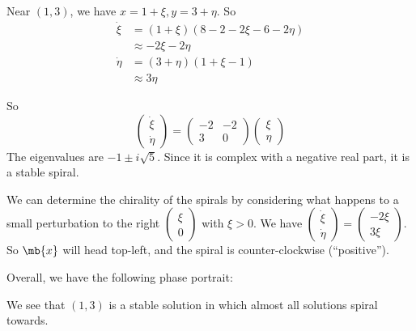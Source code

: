 \documentclass[a4paper]{article}
\begin{document}
\begin{eg}
Near $(1, 3)$, we have $x = 1 + \xi, y = 3 + \eta$. So
\begin{align*}
  \dot \xi &= (1 + \xi)(8 - 2 - 2\xi - 6 - 2\eta)\\
  &\approx -2\xi - 2\eta\\
  \dot\eta &= (3 + \eta)(1 + \xi - 1)\\
  &\approx 3\eta
\end{align*}

So
\[
\begin{pmatrix}
  \dot\xi\\\dot\eta
\end{pmatrix} = 
\begin{pmatrix}
  -2 & -2\\
  3 & 0
\end{pmatrix}
\begin{pmatrix}
  \xi\\\eta
\end{pmatrix}
\]
The eigenvalues are $- 1\pm i\sqrt{5}$. Since it is complex with a negative real part, it is a stable spiral.

We can determine the chirality of the spirals by considering what happens to a small perturbation to the right $
\begin{pmatrix}
  \xi\\0
\end{pmatrix}$ with $\xi > 0$. We have $
\begin{pmatrix}
  \dot\xi\\\dot\eta
\end{pmatrix} = 
\begin{pmatrix}
  -2\xi\\3\xi
\end{pmatrix}$. So $\mb{x}$ will head top-left, and the spiral is counter-clockwise (``positive'').






Overall, we have the following phase portrait:

We see that $(1, 3)$ is a stable solution in which almost all solutions spiral towards. 
\end{eg}
\end{document}
